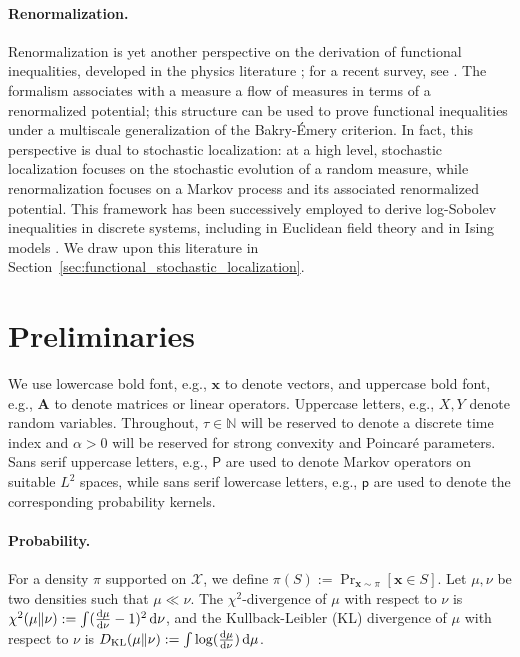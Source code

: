 \documentclass[11pt]{article}
\newcommand{\defeq}{:=}
\newcommand{\N}{\mathbb{N}}
\newcommand{\dd}{\textup{d}}
\newcommand{\ma}{\mathbf{A}}
\newcommand{\0}{\mathbf{0}}
\newcommand{\1}{\mathbf{1}}
\newcommand{\vx}{\mathbf{x}}
\newcommand{\calX}{\mathcal{X}}
\newcommand{\dkl}{D_{\textup{KL}}}
\begin{document}
\paragraph{Renormalization.} Renormalization is yet another perspective on the derivation of functional inequalities, developed in the physics literature \cite{wilson1974renormalization, polchinski1984renormalization}; for a recent survey, see \cite{BauerschmidtBD24}.  The formalism associates with a measure a flow of measures in terms of a renormalized potential; this structure can be used to prove functional inequalities under a multiscale generalization of the Bakry-\'Emery criterion.  In fact, this perspective is dual to stochastic localization: at a high level, stochastic localization focuses on the stochastic evolution of a random measure, while renormalization focuses on a Markov process and its associated renormalized potential.  This framework has been successively employed to derive log-Sobolev inequalities in discrete systems, including in Euclidean field theory \cite{Kupiainen2016renormalization, serres2022behaviorpoincareconstantpolchinski} and in Ising models \cite{BAUERSCHMIDT2019simple, Bauerschmidt2024logsobolev}. We draw upon this literature in Section~\ref{sec:functional_stochastic_localization}.


\section{Preliminaries}\label{sec:preliminaries}

We use lowercase bold font, e.g., $\vx$ to denote vectors, and uppercase bold font, e.g., $\ma$ to denote matrices or linear operators. Uppercase letters, e.g., $X,Y$ denote random variables.  Throughout, $\tau \in \N$ will be reserved to denote a discrete time index and $\alpha>0$ will be reserved for strong convexity and Poincar\'e parameters.  Sans serif uppercase letters, e.g., $\mathsf{P}$ are used to denote Markov operators on suitable $L^2$ spaces, while sans serif lowercase letters, e.g., $\mathsf{p}$ are used to denote the corresponding probability kernels.

\paragraph{Probability.}
For a density $\pi$ supported on $\calX$, we define $\pi(S)\defeq \Pr_{\vx\sim \pi}[\vx\in S]$. Let $\mu, \nu$ be two densities such that $\mu \ll \nu$.
    The $\chi^2$-divergence of $\mu$ with respect to $\nu$ is $\chi^2(\mu \| \nu)\defeq \int (\frac{\dd \mu}{\dd\nu}-1)^2 \,\dd\nu$, and the Kullback-Leibler (KL) divergence of $\mu$ with respect to $\nu$ is $\dkl(\mu \| \nu)\defeq \int \log (\frac{\dd\mu}{\dd\nu}) \,\dd\mu$.
\end{document}
